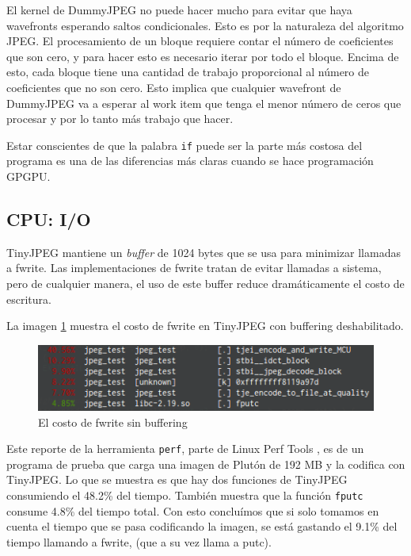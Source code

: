 {El kernel de DummyJPEG no puede hacer mucho para evitar que haya wavefronts
esperando saltos condicionales. Esto es por la naturaleza del algoritmo JPEG.
El procesamiento de un bloque requiere contar el número de coeficientes que son
cero, y para hacer esto es necesario iterar por todo el bloque. Encima de esto,
cada bloque tiene una cantidad de trabajo proporcional al número de
coeficientes que no son cero. Esto implica que cualquier wavefront de DummyJPEG
va a esperar al work item que tenga el menor número de ceros que procesar y por
lo tanto más trabajo que hacer.

Estar conscientes de que la palabra \verb+if+ puede ser la parte más costosa
del programa es una de las diferencias más claras cuando se hace programación
\gls{GPGPU}.


\subsection{CPU: I/O} \label{sub:cpu-io}

TinyJPEG mantiene un \emph{buffer} de 1024 bytes que se usa para minimizar
llamadas a fwrite. Las implementaciones de fwrite tratan de evitar llamadas a
sistema, pero de cualquier manera, el uso de este buffer reduce dramáticamente
el costo de escritura.

La imagen \ref{fig:fwrite} muestra el costo de fwrite en TinyJPEG con buffering
deshabilitado.

\begin{figure}[hb]
    \includegraphics[width=5.16666in]{fputc}
    \caption{El costo de fwrite sin buffering}
    \label{fig:fwrite}
\end{figure}

Este reporte de la herramienta \verb+perf+, parte de Linux Perf Tools
\cite{linux-perf-tools}, es de un programa de prueba que carga una imagen de
Plutón de 192 MB y la codifica con TinyJPEG. Lo que se muestra es que hay dos
funciones de TinyJPEG consumiendo el 48.2\% del tiempo. También muestra que la
función \verb+fputc+ consume 4.8\% del tiempo total. Con esto concluímos que si
solo tomamos en cuenta el tiempo que se pasa codificando la imagen, se está
gastando el 9.1\% del tiempo llamando a fwrite, (que a su vez llama a putc).

}
